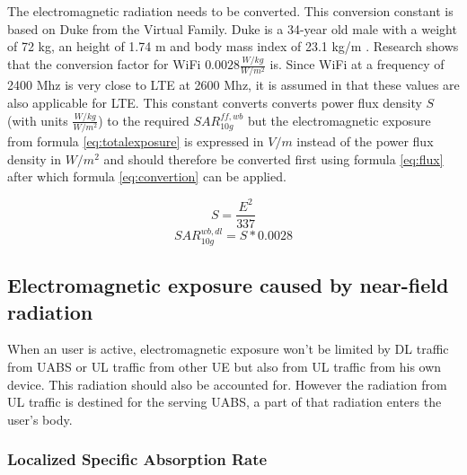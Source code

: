 The electromagnetic radiation needs to be converted. 
This conversion constant is based on Duke from the Virtual Family. Duke is a 34-year old male with  a weight of 72 kg, an height of 1.74 m and body
mass index of 23.1 kg/m \cite{J22_plets2015joint}. Research shows that the conversion factor for WiFi $0.0028 \frac{W/kg}{W/m^2}$ is.
 Since WiFi at a frequency of 2400 Mhz 
is very close to LTE at 2600 Mhz, it is assumed in \cite{J22_plets2015joint} that these values are also applicable for LTE.
This constant converts converts power flux density $S$ (with units $\frac{W/kg}{W/m^2}$) to the required $SAR^{ff,wb}_{10g}$ but the electromagnetic exposure 
from formula \ref{eq:totalexposure} is expressed in  $V/m$ instead of the power flux density in $W/m^2$ and should therefore be 
converted first using formula \ref{eq:flux} after which formula \ref{eq:convertion} can be applied.

\begin{equation}
S  = \frac{E^2}{337}
\label{eq:flux}
\end{equation}
\begin{equation}
SAR^{wb,dl}_{10g} = S * 0.0028
\label{eq:convertion}
\end{equation}

\subsection{Electromagnetic exposure caused by near-field radiation}
\label{sub:Uplinkexposure}

When an user is active, electromagnetic exposure won't be limited by \gls{DL} traffic from \gls{UABS} or \gls{UL} traffic 
from other \gls{UE} but also from \gls{UL} traffic from his own device. This radiation should also be accounted for.
However the radiation from \gls{UL} traffic is destined for the serving \gls{UABS}, a part of that radiation enters the user's body.

\subsubsection{Localized Specific Absorption Rate}

